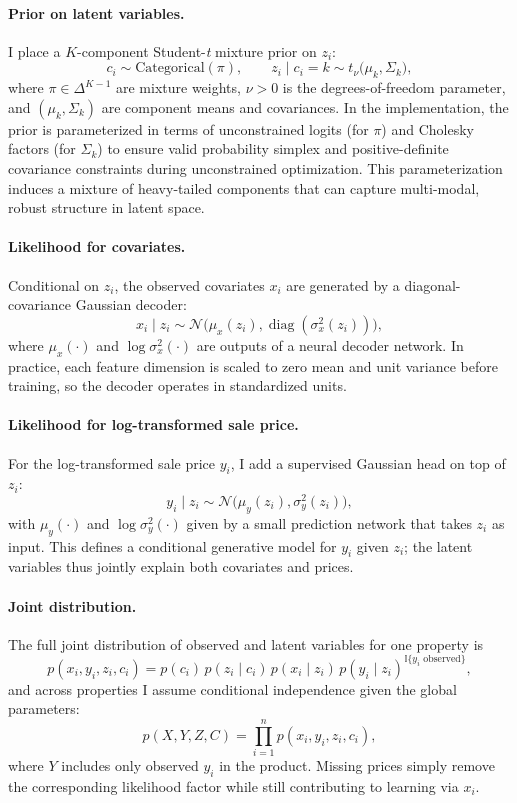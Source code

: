 \documentclass[11pt]{article}
\begin{document}
\paragraph{Prior on latent variables.} I place a $K$-component Student-\emph{t} mixture prior on $z_i$:
\[
c_i \sim \text{Categorical}(\pi), \qquad
z_i \mid c_i = k \sim t_\nu\big(\mu_k, \Sigma_k\big),
\]
where $\pi \in \Delta^{K-1}$ are mixture weights, $\nu > 0$ is the degrees-of-freedom parameter, and $(\mu_k,\Sigma_k)$ are component means and covariances. In the implementation, the prior is parameterized in terms of unconstrained logits (for $\pi$) and Cholesky factors (for $\Sigma_k$) to ensure valid probability simplex and positive-definite covariance constraints during unconstrained optimization. This parameterization induces a mixture of heavy-tailed components that can capture multi-modal, robust structure in latent space.

\paragraph{Likelihood for covariates.} Conditional on $z_i$, the observed covariates $x_i$ are generated by a diagonal-covariance Gaussian decoder:
\[
x_i \mid z_i \sim \mathcal{N}\big(\mu_x(z_i), \operatorname{diag}(\sigma^2_x(z_i))\big),
\]
where $\mu_x(\cdot)$ and $\log \sigma_x^2(\cdot)$ are outputs of a neural decoder network. In practice, each feature dimension is scaled to zero mean and unit variance before training, so the decoder operates in standardized units.

\paragraph{Likelihood for log-transformed sale price.} For the log-transformed sale price $y_i$, I add a supervised Gaussian head on top of $z_i$:
\[
y_i \mid z_i \sim \mathcal{N}\big(\mu_y(z_i), \sigma_y^2(z_i)\big),
\]
with $\mu_y(\cdot)$ and $\log \sigma_y^2(\cdot)$ given by a small prediction network that takes $z_i$ as input. This defines a conditional generative model for $y_i$ given $z_i$; the latent variables thus jointly explain both covariates and prices.

\paragraph{Joint distribution.} The full joint distribution of observed and latent variables for one property is
\[
p(x_i, y_i, z_i, c_i)
= p(c_i)\, p(z_i \mid c_i)\, p(x_i \mid z_i)\, p(y_i \mid z_i)^{\mathbb{I}\{y_i \text{ observed}\}},
\]
and across properties I assume conditional independence given the global parameters:
\[
p(X, Y, Z, C)
= \prod_{i=1}^n p(x_i, y_i, z_i, c_i),
\]
where $Y$ includes only observed $y_i$ in the product. Missing prices simply remove the corresponding likelihood factor while still contributing to learning via $x_i$.
\end{document}
